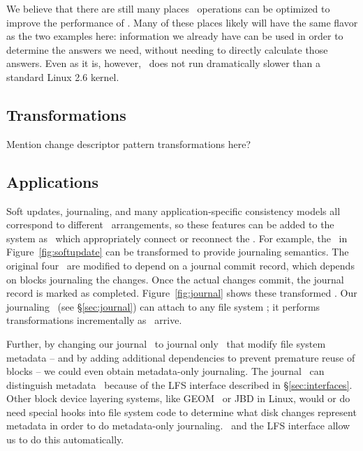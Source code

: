 We believe that there are still many places \chdesc\ operations can be
optimized to improve the performance of \Kudos. Many of these places likely
will have the same flavor as the two examples here: information we already have
can be used in order to determine the answers we need, without needing to
directly calculate those answers. Even as it is, however, \Kudos\ does not run
dramatically slower than a standard Linux 2.6 kernel.

\subsection {Transformations}
Mention change descriptor pattern transformations here?

\subsection {Applications}
Soft updates, journaling, and many application-specific consistency models all
correspond to different \chdesc\ arrangements, so these features can be added to
the system as \modules\ which appropriately connect or reconnect the \chdescs.
For example, the \chdescs\ in Figure~\ref{fig:softupdate} can be transformed to
provide journaling semantics. The original four \chdescs\ are modified to depend
on a journal commit record, which depends on blocks journaling the changes. Once
the actual changes commit, the journal record is marked as completed.
Figure~\ref{fig:journal} shows these transformed \chdescs. Our journaling
\module\ (see \S\ref{sec:journal}) can attach to any file system \module; it
performs transformations incrementally as \chdescs\ arrive.

Further, by changing our journal \module\ to journal only \chdescs\ that modify
file system metadata -- and by adding additional dependencies to prevent
premature reuse of blocks -- we could even obtain metadata-only journaling. The
journal \module\ can distinguish metadata \chdescs\ because of the LFS
interface described in \S\ref{sec:interfaces}. Other block device layering
systems, like GEOM~\cite{geom} or JBD in Linux, would or do need special hooks
into file system code to determine what disk changes represent metadata in
order to do metadata-only journaling. \Chdescs\ and the LFS interface allow us
to do this automatically.
